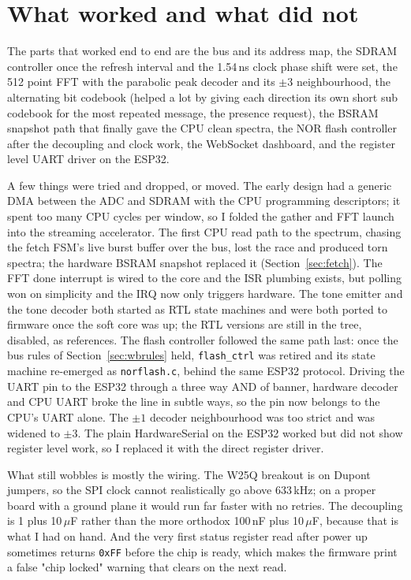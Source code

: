 \documentclass[a4paper,11pt]{article}
\begin{document}
\section{What worked and what did not}

The parts that worked end to end are the bus and its address map, the SDRAM
controller once the refresh interval and the 1.54\,ns clock phase shift were set, the
512 point FFT with the parabolic peak decoder and its $\pm 3$ neighbourhood, the
alternating bit codebook (helped a lot by giving each direction its own short
sub codebook for the most repeated message, the presence request), the BSRAM
snapshot path that finally gave the CPU clean spectra, the NOR flash
controller after the decoupling and clock work, the WebSocket dashboard, and the
register level UART driver on the ESP32.

A few things were tried and dropped, or moved. The early design had a generic DMA
between the ADC and SDRAM with the CPU programming descriptors; it spent too many
CPU cycles per window, so I folded the gather and FFT launch into the streaming
accelerator. The first CPU read path to the spectrum, chasing the fetch FSM's
live burst buffer over the bus, lost the race and produced torn spectra; the
hardware BSRAM snapshot replaced it (Section~\ref{sec:fetch}). The FFT done
interrupt is wired to the core and the ISR plumbing exists, but polling won on
simplicity and the IRQ now only triggers hardware. The tone emitter and the tone
decoder both started as RTL state machines and were both ported to firmware once
the soft core was up; the RTL versions are still in the tree, disabled, as
references. The flash controller followed the same path last: once the bus rules
of Section~\ref{sec:wbrules} held, \texttt{flash\_ctrl} was retired and its
state machine re-emerged as \texttt{norflash.c}, behind the same ESP32 protocol.
Driving the UART pin to the ESP32 through a three way AND of banner,
hardware decoder and CPU UART broke the line in subtle ways, so the pin now
belongs to the CPU's UART alone. The
$\pm 1$ decoder neighbourhood was too strict and was widened to $\pm 3$. The plain
HardwareSerial on the ESP32 worked but did not show register level work, so I
replaced it with the direct register driver.

What still wobbles is mostly the wiring. The W25Q breakout is on Dupont jumpers, so
the SPI clock cannot realistically go above 633\,kHz; on a proper board with a
ground plane it would run far faster with no retries. The decoupling is 1 plus
10\,$\mu$F rather than the more orthodox 100\,nF plus 10\,$\mu$F, because that is
what I had on hand. And the very first status register read after power up sometimes
returns \texttt{0xFF} before the chip is ready, which makes the firmware print a
false "chip locked" warning that clears on the next read.
\end{document}

